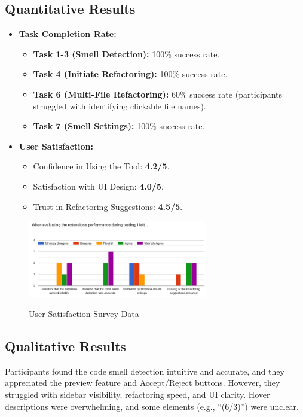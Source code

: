 \documentclass[12pt, titlepage]{article}
\begin{document}
\subsection*{Quantitative Results}
\begin{itemize}
  \item \textbf{Task Completion Rate:}
    \begin{itemize}
      \item \textbf{Task 1-3 (Smell Detection):} 100\% success rate.
      \item \textbf{Task 4 (Initiate Refactoring):} 100\% success rate.
      \item \textbf{Task 6 (Multi-File Refactoring):} 60\% success
        rate (participants struggled with identifying clickable file names).
      \item \textbf{Task 7 (Smell Settings):} 100\% success rate.
    \end{itemize}
  \item \textbf{User Satisfaction:}
    \begin{itemize}
      \item Confidence in Using the Tool: \textbf{4.2/5}.
      \item Satisfaction with UI Design: \textbf{4.0/5}.
      \item Trust in Refactoring Suggestions: \textbf{4.5/5}.
    \end{itemize}
\end{itemize}

\begin{figure}[H]
  \centering
  \includegraphics[width=0.7\textwidth]{../Images/usability-satisfaction-graph.png}
  \label{img:usability-satisfaction}
  \caption{User Satisfaction Survey Data}
\end{figure}

\subsection*{Qualitative Results}
Participants found the code smell detection intuitive and accurate,
and they appreciated the preview feature and Accept/Reject buttons.
However, they struggled with sidebar visibility, refactoring speed,
and UI clarity. Hover descriptions were overwhelming, and some
elements (e.g., ``(6/3)'') were unclear.
\end{document}
